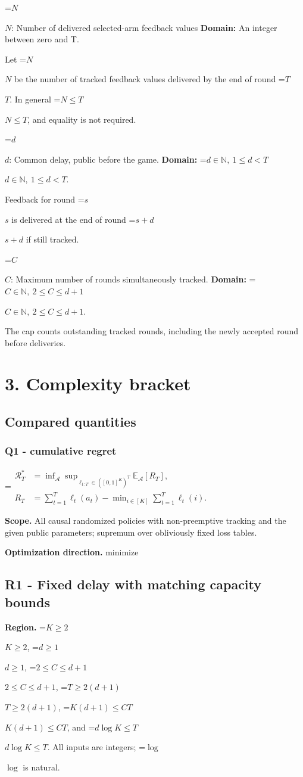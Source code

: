 \documentclass[10pt,a4paper]{article}
\newcommand{\AtlasMath}[1]{\par\begingroup\centering\setbox0=\hbox{$\displaystyle #1$}\ifdim\wd0>1.4\linewidth\typeout{ATLAS WIDE FORMULA: \the\wd0}\fi\ifdim\wd0>\linewidth\resizebox{\linewidth}{!}{\box0}\else\box0\fi\par\endgroup}
\newcommand{\AtlasInlineMath}[1]{\begingroup\setbox0=\hbox{$#1$}\ifdim\wd0>.4\linewidth\endgroup\AtlasMath{#1}\else\endgroup$#1$\fi}
\begin{document}
\AtlasInlineMath{N}: Number of delivered selected-arm feedback values \textbf{Domain:} An integer between zero and T.

Let \AtlasInlineMath{N} be the number of tracked feedback values delivered by the end of round \AtlasInlineMath{T}. In general \AtlasInlineMath{N\le T}, and equality is not required.

\AtlasInlineMath{d}: Common delay, public before the game. \textbf{Domain:} \AtlasInlineMath{d\in\mathbb N,\ 1\le d<T}.

Feedback for round \AtlasInlineMath{s} is delivered at the end of round \AtlasInlineMath{s+d} if still tracked.

\AtlasInlineMath{C}: Maximum number of rounds simultaneously tracked. \textbf{Domain:} \AtlasInlineMath{C\in\mathbb N,\ 2\le C\le d+1}.

The cap counts outstanding tracked rounds, including the newly accepted round before deliveries.

\section{3. Complexity bracket}
\subsection{Compared quantities}
\subsubsection{Q1 - cumulative regret}
\AtlasMath{\begin{aligned}\mathcal R_T^*&=\inf_{\mathcal A}\sup_{\ell_{1:T}\in([0,1]^K)^T}\mathbb E_{\mathcal A}[R_T],\\ R_T&=\sum_{t=1}^T\ell_t(a_t)-\min_{i\in[K]}\sum_{t=1}^T\ell_t(i).\end{aligned}}
\textbf{Scope.} All causal randomized policies with non-preemptive tracking and the given public parameters; supremum over obliviously fixed loss tables.

\textbf{Optimization direction.} minimize

\subsection{R1 - Fixed delay with matching capacity bounds}
\textbf{Region.} \AtlasInlineMath{K\ge2}, \AtlasInlineMath{d\ge1}, \AtlasInlineMath{2\le C\le d+1}, \AtlasInlineMath{T\ge2(d+1)}, \AtlasInlineMath{K(d+1)\le CT}, and \AtlasInlineMath{d\log K\le T}. All inputs are integers; \AtlasInlineMath{\log} is natural.
\end{document}
